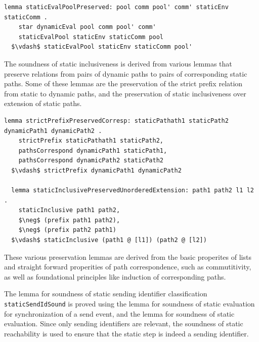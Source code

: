 \documentclass[letterpaper, 11pt]{report}
\begin{document}
\begin{lstlisting}[language=logic, mathescape]
  lemma staticEvalPoolPreserved: pool comm pool' comm' staticEnv staticComm .
    star dynamicEval pool comm pool' comm' 
    staticEvalPool staticEnv staticComm pool
  $\vdash$ staticEvalPool staticEnv staticComm pool'
\end{lstlisting}

The soundness of static inclusiveness is derived from various lemmas that
preserve relations from pairs of dynamic paths to pairs of corresponding static paths. 
Some of these lemmas are
the preservation of the strict prefix relation from static to dynamic paths,
and the preservation of static inclusiveness over extension of static paths.

\begin{lstlisting}[language=logic, mathescape]
  lemma strictPrefixPreservedCorresp: staticPathath1 staticPath2 dynamicPath1 dynamicPath2 .
    strictPrefix staticPathath1 staticPath2, 
    pathsCorrespond dynamicPath1 staticPath1,
    pathsCorrespond dynamicPath2 staticPath2
  $\vdash$ strictPrefix dynamicPath1 dynamicPath2

  lemma staticInclusivePreservedUnorderedExtension: path1 path2 l1 l2 .
    staticInclusive path1 path2, 
    $\neg$ (prefix path1 path2),
    $\neg$ (prefix path2 path1)
  $\vdash$ staticInclusive (path1 @ [l1]) (path2 @ [l2])
\end{lstlisting}

These various preservation lemmas are derived from the basic properites of lists 
and straight forward properities of path correspondence, such as commutitivity, as
well as foundational principles like induction of corresponding paths.

The lemma for soundness of static sending identifier classification \lstinline{staticSendIdSound}
is proved using the lemma for soundness of static evaluation for synchronization of a send event,
and the lemma for soundness of static evaluation.
Since only sending identifiers are relevant,
the soundness of static reachability is
used to ensure that the static step is indeed a sending identifier. 
\end{document}
